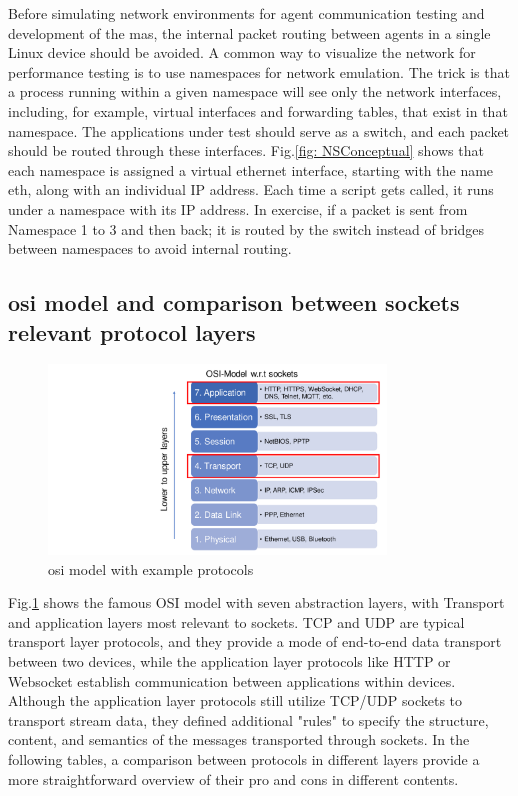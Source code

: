 Before simulating network environments for agent communication testing 
and development of the \gls{mas}, the internal packet routing between agents 
in a single Linux device should be avoided. A common way to visualize 
the network for performance testing is to use namespaces for network 
emulation. The trick is that a process running within a given
namespace will see only the network interfaces, including, for example, 
virtual interfaces and forwarding tables, that exist in that namespace. 
The applications under test should serve as a
switch, and each packet should be routed through these interfaces. 
Fig.\ref{fig: NSConceptual} shows that each namespace is assigned 
a virtual ethernet interface, 
starting with the name eth, along with an individual IP address. 
Each time a script gets called, it runs under a namespace with its 
IP address. In exercise, if a packet is sent from
Namespace 1 to 3 and then back; it is routed by the switch instead of 
bridges between namespaces to avoid internal routing.

\subsection{\gls{osi} model and comparison between sockets relevant protocol layers}
\begin{figure}[htbp]
\includegraphics[width=0.8\textwidth]{figures/OSI.pdf}
\centering
\caption{\gls{osi} model with example protocols \label{fig: OSI}}
\end{figure}



Fig.\ref{fig: OSI} shows the famous OSI model with seven abstraction layers, with Transport and 
application layers most relevant to sockets. TCP and UDP are typical transport layer 
protocols, and they provide a mode of end-to-end data transport between two devices, 
while the application layer protocols like HTTP or Websocket establish communication 
between applications within devices. Although the application layer protocols still 
utilize TCP/UDP sockets to transport stream data, they defined additional "rules" to 
specify the structure, content, and semantics of the messages transported through 
sockets. In the following tables, a comparison
between protocols in different layers provide a more straightforward overview of 
their pro and cons in different contents.



